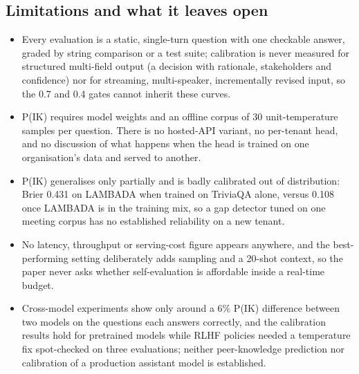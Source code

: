 \subsection{Limitations and what it leaves open}
\begin{itemize}[leftmargin=*, itemsep=1pt, topsep=2pt]
  \item Every evaluation is a static, single-turn question with one checkable answer, graded by string comparison or a test suite; calibration is never measured for structured multi-field output (a decision with rationale, stakeholders and confidence) nor for streaming, multi-speaker, incrementally revised input, so the 0.7 and 0.4 gates cannot inherit these curves.
  \item P(IK) requires model weights and an offline corpus of 30 unit-temperature samples per question. There is no hosted-API variant, no per-tenant head, and no discussion of what happens when the head is trained on one organisation's data and served to another.
  \item P(IK) generalises only partially and is badly calibrated out of distribution: Brier 0.431 on LAMBADA when trained on TriviaQA alone, versus 0.108 once LAMBADA is in the training mix, so a gap detector tuned on one meeting corpus has no established reliability on a new tenant.
  \item No latency, throughput or serving-cost figure appears anywhere, and the best-performing setting deliberately adds sampling and a 20-shot context, so the paper never asks whether self-evaluation is affordable inside a real-time budget.
  \item Cross-model experiments show only around a 6\% P(IK) difference between two models on the questions each answers correctly, and the calibration results hold for pretrained models while RLHF policies needed a temperature fix spot-checked on three evaluations; neither peer-knowledge prediction nor calibration of a production assistant model is established.
\end{itemize}
